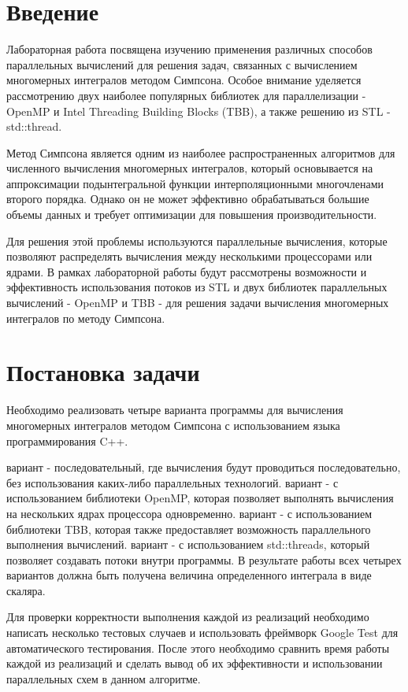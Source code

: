\documentclass[14pt, a4paper]{extarticle}
\begin{document}
  \tableofcontents
  \thispagestyle{empty}
  \newpage

  \pagestyle{plain}
  \setcounter{page}{3}

  \section{Введение}
    Лабораторная работа посвящена изучению применения различных способов параллельных вычислений для решения задач, связанных с вычислением многомерных интегралов методом Симпсона. Особое внимание уделяется рассмотрению двух наиболее популярных библиотек для параллелизации - OpenMP и Intel Threading Building Blocks (TBB), а также решению из STL - std::thread.
    
    Метод Симпсона является одним из наиболее распространенных алгоритмов для численного вычисления многомерных интегралов, который основывается на аппроксимации подынтегральной функции интерполяционными многочленами второго порядка. Однако он не может эффективно обрабатываться большие объемы данных и требует оптимизации для повышения производительности.
    
    Для решения этой проблемы используются параллельные вычисления, которые позволяют распределять вычисления между несколькими процессорами или ядрами. В рамках лабораторной работы будут рассмотрены возможности и эффективность использования потоков из STL и двух библиотек параллельных вычислений - OpenMP и TBB - для решения задачи вычисления многомерных интегралов по методу Симпсона.

  \newpage

  \section{Постановка задачи}
  Необходимо реализовать четыре варианта программы для вычисления многомерных интегралов методом Симпсона с использованием языка программирования C++.
   \begin{itemize}
 вариант - последовательный, где вычисления будут проводиться последовательно, без использования каких-либо параллельных технологий.
 вариант - с использованием библиотеки OpenMP, которая позволяет выполнять вычисления на нескольких ядрах процессора одновременно.
 вариант - с использованием библиотеки TBB, которая также предоставляет возможность параллельного выполнения вычислений.
 вариант - с использованием std::threads, который позволяет создавать потоки внутри программы.
В результате работы всех четырех вариантов должна быть получена величина определенного интеграла в виде скаляра.
\end{itemize}
Для проверки корректности выполнения каждой из реализаций необходимо написать несколько тестовых случаев и использовать фреймворк Google Test для автоматического тестирования.
После этого необходимо сравнить время работы каждой из реализаций и сделать вывод об их эффективности и использовании параллельных схем в данном алгоритме.
  \newpage
\end{document}
